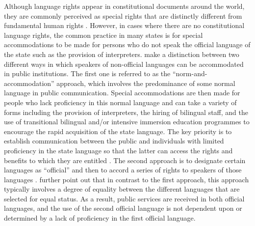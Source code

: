\documentclass[output=paper,colorlinks,citecolor=brown]{langscibook}
\begin{document}
\hspace*{-4.3pt}Although language rights appear in constitutional documents around the world, they are commonly perceived as special rights that are distinctly different from fundamental human rights \citep[231]{Pinto2014}. However, in cases where there are no constitutional language rights, the common practice in many states is for special accommodations to be made for persons who do not speak the official language of the state such as the provision of interpreters. \citet[8-9]{KymlickaPatten2003} make a distinction between two different ways in which speakers of non-official languages can be accommodated in public institutions. The first one is referred to as the “norm-and-accommodation” approach, which involves the predominance of some normal language in public communication. Special accommodations are then made for people who lack proficiency in this normal language and can take a variety of forms including the provision of interpreters, the hiring of bilingual staff, and the use of transitional bilingual and/or intensive immersion education programmes to encourage the rapid acquisition of the state language. The key priority is to establish communication between the public and individuals with limited proficiency in the state language so that the latter can access the rights and benefits to which they are entitled \citep{KymlickaPatten2003}. The second approach is to designate certain languages as “official” and then to accord a series of rights to speakers of those languages \citep[9]{KymlickaPatten2003}. \citet{KymlickaPatten2003} further point out that in contrast to the first approach, this approach typically involves a degree of equality between the different languages that are selected for equal status. As a result, public services are received in both official languages, and the use of the second official language is not dependent upon or determined by a lack of proficiency in the first official language.
\end{document}
